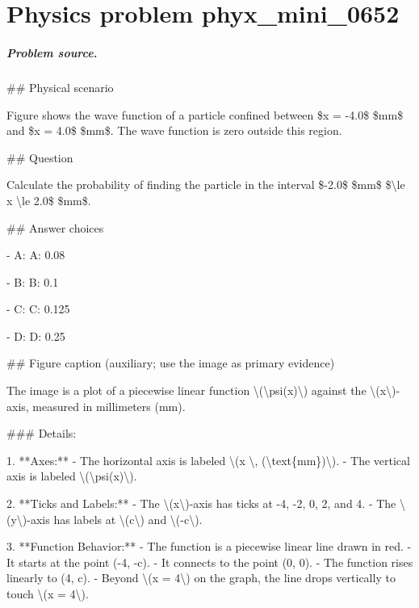 
\chapter{Physics problem phyx\_mini\_0652}
\label{ch:PhyXMiniProblems_problem_phyx_mini_0652}

\paragraph{Problem source.}
\#\# Physical scenario

Figure shows the wave function of a particle confined between \$x = -4.0\$ \$mm\$ and \$x = 4.0\$ \$mm\$. The wave function is zero outside this region.

\#\# Question

Calculate the probability of finding the particle in the interval \$-2.0\$ \$mm\$ \$\textbackslash{}le x \textbackslash{}le 2.0\$ \$mm\$.

\#\# Answer choices

- A: A: 0.08

- B: B: 0.1

- C: C: 0.125

- D: D: 0.25

\#\# Figure caption (auxiliary; use the image as primary evidence)

The image is a plot of a piecewise linear function \textbackslash{}(\textbackslash{}psi(x)\textbackslash{}) against the \textbackslash{}(x\textbackslash{})-axis, measured in millimeters (mm).

\#\#\# Details:

1. **Axes:**
   - The horizontal axis is labeled \textbackslash{}(x \textbackslash{}, (\textbackslash{}text\{mm\})\textbackslash{}).
   - The vertical axis is labeled \textbackslash{}(\textbackslash{}psi(x)\textbackslash{}).

2. **Ticks and Labels:**
   - The \textbackslash{}(x\textbackslash{})-axis has ticks at -4, -2, 0, 2, and 4.
   - The \textbackslash{}(y\textbackslash{})-axis has labels at \textbackslash{}(c\textbackslash{}) and \textbackslash{}(-c\textbackslash{}).

3. **Function Behavior:**
   - The function is a piecewise linear line drawn in red.
   - It starts at the point (-4, -c).
   - It connects to the point (0, 0).
   - The function rises linearly to (4, c).
   - Beyond \textbackslash{}(x = 4\textbackslash{}) on the graph, the line drops vertically to touch \textbackslash{}(x = 4\textbackslash{}).

